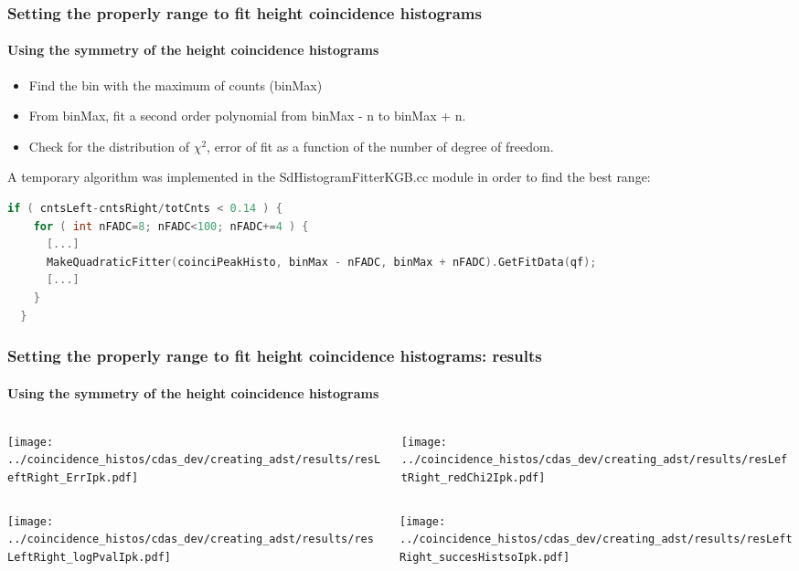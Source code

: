 \documentclass[aspectratio=169]{beamer}
\begin{document}
\begin{frame}[fragile]
  \frametitle{Setting the properly range to fit height
  coincidence histograms}
  \framesubtitle{Using the symmetry of the height coincidence
  histograms}
  \vspace{0.5cm}

  \begin{itemize}
    \item Find the bin with the maximum of counts (binMax)           
    \item From binMax, fit a second order polynomial from binMax
      - n to binMax + n.
    \item Check for the distribution of $\chi^2$, error of fit
      as a function of the number of degree of freedom.
  \end{itemize}
  \vspace{.5cm}

  A temporary algorithm was implemented in the
  SdHistogramFitterKGB.cc module in order to find the best range:
  \begin{lstlisting}[language=C++, basicstyle = \ttfamily\tiny]
  if ( cntsLeft-cntsRight/totCnts < 0.14 ) {
    for ( int nFADC=8; nFADC<100; nFADC+=4 ) {
      [...]
      MakeQuadraticFitter(coinciPeakHisto, binMax - nFADC, binMax + nFADC).GetFitData(qf);
      [...]
    }
  }
  \end{lstlisting}
\end{frame}

\begin{frame}
  \frametitle{Setting the properly range to fit height
  coincidence histograms: results}
  \framesubtitle{Using the symmetry of the height coincidence
  histograms}
  \vspace{0.5cm}

  \begin{columns}
    \centering
    \begin{column}{0.5\textwidth}
      \texttt{[image: ../coincidence\_histos/cdas\_dev/creating\_adst/results/resLeftRight\_ErrIpk.pdf]}
    \end{column}
    \begin{column}{0.5\textwidth}
      \texttt{[image: ../coincidence\_histos/cdas\_dev/creating\_adst/results/resLeftRight\_redChi2Ipk.pdf]}
    \end{column}
  \end{columns}

  \begin{columns}
    \centering
    \begin{column}{0.5\textwidth}
      \texttt{[image: ../coincidence\_histos/cdas\_dev/creating\_adst/results/resLeftRight\_logPvalIpk.pdf]}
    \end{column}
    \begin{column}{0.5\textwidth}
      \texttt{[image: ../coincidence\_histos/cdas\_dev/creating\_adst/results/resLeftRight\_succesHistsoIpk.pdf]}
    \end{column}
  \end{columns}
\end{frame}
\end{document}
